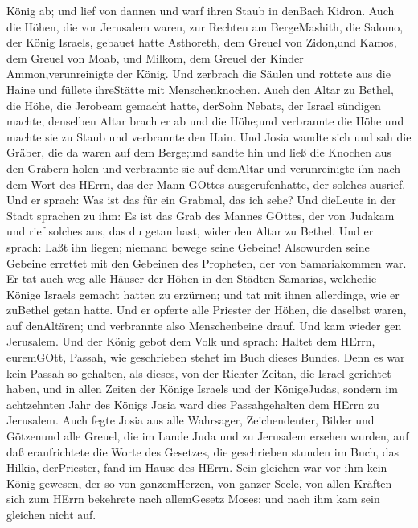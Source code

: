 König ab; und lief von dannen und warf ihren Staub in denBach Kidron.
 Auch die Höhen, die vor Jerusalem waren, zur Rechten am
BergeMashith, die Salomo, der König Israels, gebauet hatte Asthoreth,
dem Greuel von Zidon,und Kamos, dem Greuel von Moab, und Milkom, dem
Greuel der Kinder Ammon,verunreinigte der König.  Und
zerbrach die Säulen und rottete aus die Haine und füllete ihreStätte mit
Menschenknochen.  Auch den Altar zu Bethel, die Höhe, die
Jerobeam gemacht hatte, derSohn Nebats, der Israel sündigen machte,
denselben Altar brach er ab und die Höhe;und verbrannte die Höhe und
machte sie zu Staub und verbrannte den Hain.  Und Josia
wandte sich und sah die Gräber, die da waren auf dem Berge;und sandte
hin und ließ die Knochen aus den Gräbern holen und verbrannte sie auf
demAltar und verunreinigte ihn nach dem Wort des HErrn, das der Mann
GOttes ausgerufenhatte, der solches ausrief.  Und er
sprach: Was ist das für ein Grabmal, das ich sehe? Und dieLeute in der
Stadt sprachen zu ihm: Es ist das Grab des Mannes GOttes, der von
Judakam und rief solches aus, das du getan hast, wider den Altar zu
Bethel.  Und er sprach: Laßt ihn liegen; niemand bewege
seine Gebeine! Alsowurden seine Gebeine errettet mit den Gebeinen des
Propheten, der von Samariakommen war.  Er tat auch weg alle
Häuser der Höhen in den Städten Samarias, welchedie Könige Israels
gemacht hatten zu erzürnen; und tat mit ihnen allerdinge, wie er
zuBethel getan hatte.  Und er opferte alle Priester der
Höhen, die daselbst waren, auf denAltären; und verbrannte also
Menschenbeine drauf. Und kam wieder gen Jerusalem.  Und der
König gebot dem Volk und sprach: Haltet dem HErrn, euremGOtt, Passah,
wie geschrieben stehet im Buch dieses Bundes.  Denn es war
kein Passah so gehalten, als dieses, von der Richter Zeitan, die Israel
gerichtet haben, und in allen Zeiten der Könige Israels und der
KönigeJudas,  sondern im achtzehnten Jahr des Königs Josia
ward dies Passahgehalten dem HErrn zu Jerusalem.  Auch
fegte Josia aus alle Wahrsager, Zeichendeuter, Bilder und Götzenund alle
Greuel, die im Lande Juda und zu Jerusalem ersehen wurden, auf daß
eraufrichtete die Worte des Gesetzes, die geschrieben stunden im Buch,
das Hilkia, derPriester, fand im Hause des HErrn.  Sein
gleichen war vor ihm kein König gewesen, der so von ganzemHerzen, von
ganzer Seele, von allen Kräften sich zum HErrn bekehrete nach
allemGesetz Moses; und nach ihm kam sein gleichen nicht auf.
